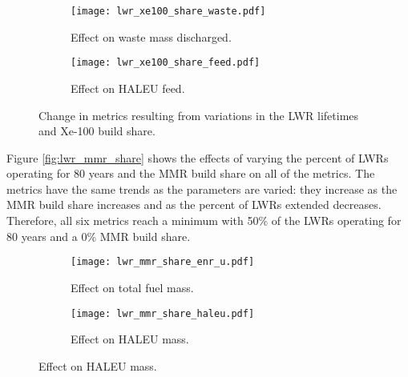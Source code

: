 \begin{figure}
    \ContinuedFloat    
    \begin{subfigure}[t]{0.48\textwidth}
        \centering
        \texttt{[image: lwr\_xe100\_share\_waste.pdf]}
        \caption{Effect on waste mass discharged.}
        \label{fig:lwr_xe100_share_waste}
    \end{subfigure}
    \hfill
    \begin{subfigure}[t]{0.48\textwidth}
        \centering
        \texttt{[image: lwr\_xe100\_share\_feed.pdf]}
        \caption{Effect on HALEU feed.}
        \label{fig:lwr_xe100_share_feed}
    \end{subfigure}
    \caption{Change in metrics resulting from variations in the 
    LWR lifetimes and Xe-100 build share.}
    \label{fig:lwr_xe100_share}
\end{figure}

Figure \ref{fig:lwr_mmr_share} shows the effects of varying the 
percent of \glspl{LWR} operating for 80 years and the \gls{MMR} 
build share on all of the metrics. The metrics have the same trends 
as the parameters are varied: they increase as the \gls{MMR} build 
share increases and as the percent of \glspl{LWR} extended 
decreases. Therefore, all six metrics reach a minimum with 50\% of 
the \glspl{LWR} operating for 80 years and a 0\% \gls{MMR} build 
share. 

\begin{figure}
    \begin{subfigure}[t]{0.48\textwidth}
        \centering
        \texttt{[image: lwr\_mmr\_share\_enr\_u.pdf]}
        \caption{Effect on total fuel mass.}
        \label{fig:lwr_mmr_share_enr_u}
    \end{subfigure}
    \hfill
    \begin{subfigure}[t]{0.48\textwidth}
        \centering
        \texttt{[image: lwr\_mmr\_share\_haleu.pdf]}
        \caption{Effect on HALEU mass.}
        \label{fig:lwr_mmr_share_haleu}
    \end{subfigure}
\end{figure}

